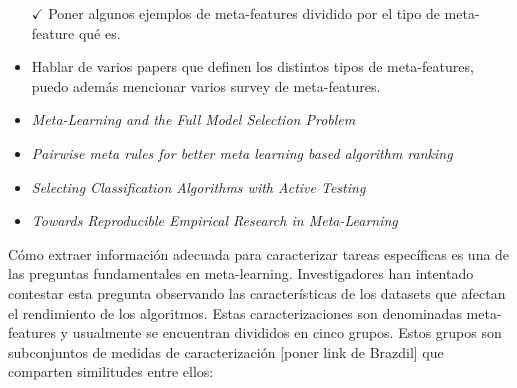 \begin{itemize}
	\item[$\checkmark$] Poner algunos ejemplos de meta-features dividido por el tipo de meta-feature qué es.
	\item Hablar de varios papers que definen los distintos tipos de meta-features, puedo además mencionar varios survey de meta-features.
	\item \textit{Meta-Learning and the Full Model Selection Problem}
	\item \textit{Pairwise meta rules for better meta learning based algorithm ranking}
	\item \textit{Selecting Classification Algorithms with Active Testing}
	\item \textit{Towards Reproducible Empirical Research in Meta-Learning}
\end{itemize}

Cómo extraer información adecuada para caracterizar tareas específicas es una de las preguntas fundamentales en meta-learning. Investigadores han intentado contestar esta pregunta observando las características de los datasets que afectan el rendimiento de los algoritmos. Estas caracterizaciones son denominadas meta-features y usualmente se encuentran divididos en cinco grupos. Estos grupos son subconjuntos de medidas de caracterización [poner link de Brazdil] que comparten similitudes entre ellos:


